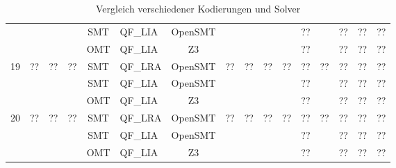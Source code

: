 \begin{landscape}
\begin{table}[H]
\begin{tabular}{|c|c|c|c|c|l|c|c|c|c|c|c|c|c|c|c|}
            & & & & SMT & QF\_LIA & OpenSMT & & & & & ?? & & ?? & ?? & ?? \\
            & & & & OMT & QF\_LIA & Z3 & & & & & ?? & & ?? & ?? & ?? \\
            \hline
            \multirow{3}{*}{19} & \multirow{3}{*}{??} & \multirow{3}{*}{??} & \multirow{3}{*}{??} & SMT & QF\_LRA & OpenSMT & \multirow{3}{*}{??} & \multirow{3}{*}{??} & \multirow{3}{*}{??} & \multirow{3}{*}{??} & ?? & \multirow{3}{*}{??} & ?? & ?? & ?? \\
            & & & & SMT & QF\_LIA & OpenSMT & & & & & ?? & & ?? & ?? & ?? \\
            & & & & OMT & QF\_LIA & Z3 & & & & & ?? & & ?? & ?? & ?? \\
            \hline
            \multirow{3}{*}{20} & \multirow{3}{*}{??} & \multirow{3}{*}{??} & \multirow{3}{*}{??} & SMT & QF\_LRA & OpenSMT & \multirow{3}{*}{??} & \multirow{3}{*}{??} & \multirow{3}{*}{??} & \multirow{3}{*}{??} & ?? & \multirow{3}{*}{??} & ?? & ?? & ?? \\
            & & & & SMT & QF\_LIA & OpenSMT & & & & & ?? & & ?? & ?? & ?? \\
            & & & & OMT & QF\_LIA & Z3 & & & & & ?? & & ?? & ?? & ?? \\
            \hline
        \end{tabular}
        \caption{Vergleich verschiedener Kodierungen und Solver}
        \label{tab:vglkodierungreal}
    \end{table}
\end{landscape}
